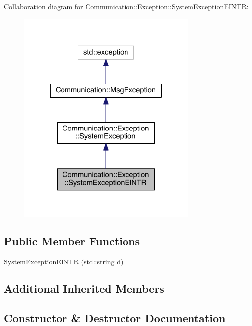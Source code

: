 Collaboration diagram for Communication\+:\+:Exception\+:\+:System\+Exception\+E\+I\+N\+T\+R\+:\nopagebreak
\begin{figure}[H]
\begin{center}
\leavevmode
\includegraphics[width=248pt]{class_communication_1_1_exception_1_1_system_exception_e_i_n_t_r__coll__graph}
\end{center}
\end{figure}
\subsection*{Public Member Functions}
\begin{DoxyCompactItemize}
\item 
\hyperlink{class_communication_1_1_exception_1_1_system_exception_e_i_n_t_r_ad7344760ad45fbcfd4fe0b7e0f0beb54}{System\+Exception\+E\+I\+N\+T\+R} (std\+::string d)
\end{DoxyCompactItemize}
\subsection*{Additional Inherited Members}


\subsection{Constructor \& Destructor Documentation}
\hypertarget{class_communication_1_1_exception_1_1_system_exception_e_i_n_t_r_ad7344760ad45fbcfd4fe0b7e0f0beb54}{}
